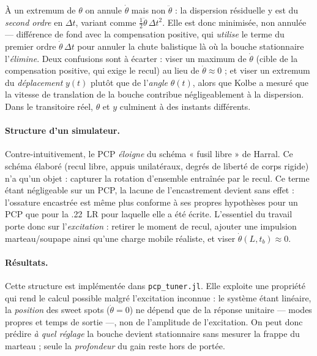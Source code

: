 \documentclass[12pt,a4paper]{article}
\begin{document}
	À un extremum de $\theta$ on annule $\dot\theta$ mais non $\ddot\theta$ : la dispersion résiduelle y est du \emph{second ordre} en $\Delta t$, variant comme $\tfrac{1}{2}\ddot\theta\,\Delta t^2$. Elle est donc minimisée, non annulée --- différence de fond avec la compensation positive, qui \emph{utilise} le terme du premier ordre $\dot\theta\,\Delta t$ pour annuler la chute balistique là où la bouche stationnaire l'\emph{élimine}. Deux confusions sont à écarter : viser un maximum de $\dot\theta$ (cible de la compensation positive, qui exige le recul) au lieu de $\dot\theta \approx 0$ ; et viser un extremum du \emph{déplacement} $y(t)$ plutôt que de l'\emph{angle} $\theta(t)$, alors que Kolbe a mesuré que la vitesse de translation de la bouche contribue négligeablement à la dispersion. Dans le transitoire réel, $\theta$ et $y$ culminent à des instants différents.

	\paragraph{Structure d'un simulateur.} Contre-intuitivement, le PCP \emph{éloigne} du schéma « fusil libre » de Harral. Ce schéma élaboré (recul libre, appuis unilatéraux, degrés de liberté de corps rigide) n'a qu'un objet : capturer la rotation d'ensemble entraînée par le recul. Ce terme étant négligeable sur un PCP, la lacune de l'encastrement devient sans effet : l'ossature encastrée est même plus conforme à ses propres hypothèses pour un PCP que pour la .22~LR pour laquelle elle a été écrite. L'essentiel du travail porte donc sur l'\emph{excitation} : retirer le moment de recul, ajouter une impulsion marteau/soupape ainsi qu'une charge mobile réaliste, et viser $\dot\theta(L,t_b) \approx 0$.

	\paragraph{Résultats.} Cette structure est implémentée dans \texttt{pcp\_tuner.jl}. Elle exploite une propriété qui rend le calcul possible malgré l'excitation inconnue : le système étant linéaire, la \emph{position} des sweet spots ($\dot\theta = 0$) ne dépend que de la réponse unitaire --- modes propres et temps de sortie ---, non de l'amplitude de l'excitation. On peut donc prédire \emph{à quel réglage} la bouche devient stationnaire sans mesurer la frappe du marteau ; seule la \emph{profondeur} du gain reste hors de portée.
\end{document}
